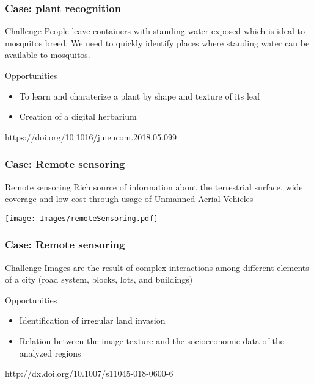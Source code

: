 \documentclass{beamer}
\begin{document}
\begin{frame}\frametitle{Case: plant recognition}

  \begin{block}{Challenge}
People leave containers with standing water exposed which is ideal to mosquitos breed.
We need to quickly identify places where standing water can be available to mosquitos.
  \end{block}

	\begin{exampleblock}{Opportunities}
    \begin{itemize}
      \item To learn and charaterize a plant by shape and texture of its leaf
      \item Creation of a digital herbarium
    \end{itemize}
	\end{exampleblock}

  https://doi.org/10.1016/j.neucom.2018.05.099
\end{frame}


\begin{frame}\frametitle{Case: Remote sensoring}
  \begin{alertblock}{Remote sensoring}
Rich source of information about the terrestrial surface, wide coverage and low cost through usage of Unmanned Aerial Vehicles
  \end{alertblock}


\centering  \texttt{[image: Images/remoteSensoring.pdf]}
\end{frame}

\begin{frame}\frametitle{Case: Remote sensoring}

  \begin{block}{Challenge}
Images are the result of complex interactions among different elements of a city (road system, blocks, lots, and buildings)
  \end{block}

	\begin{exampleblock}{Opportunities}
    \begin{itemize}
      \item Identification of irregular land invasion
      \item Relation between the image texture and the socioeconomic data of the analyzed regions
    \end{itemize}
	\end{exampleblock}

  http://dx.doi.org/10.1007/s11045-018-0600-6
\end{frame}
\end{document}
